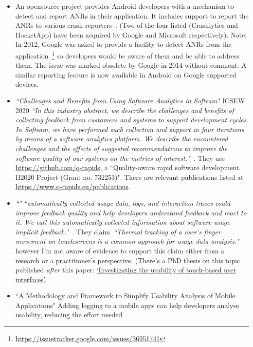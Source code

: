 \begin{itemize}
    \item An opensource project provides Android developers with a mechanism to detect and report ANRs in their application. It includes support to report the ANRs to various crash reporters~\citep{salomonbrys_github_anr_watchdog}. (Two of the four listed (Crashlytics and HocketApp) have been acquired by Google and Microsoft respectively). Note: In 2012, Google was asked to provide a facility to detect ANRs from the application~\footnote{\url{https://issuetracker.google.com/issues/36951741}} so developers would be aware of them and be able to address them. The issue was marked obsolete by Google in 2014 without comment. A similar reporting feature is now available in Android on Google supported devices.
    
    \item \emph{``Challenges and Benefits from Using Software Analytics in Softeam"} ICSEW 2020 \emph{``In this industry abstract, we describe the challenges and benefits of collecting feedback from customers and systems to support development cycles. In Softeam, we have performed such collection and support in four iterations by means of a software analytics platform. We describe the encountered challenges and the effects of suggested recommendations to improve the software quality of our systems on the metrics of interest."}~\cite{bagnato2020_challenges_and_benefits_from_using_software_analytics_in_softeam}. They use \url{https://github.com/q-rapids}, a ``Quality-aware rapid software development. H2020 Project (Grant no. 732253)". There are relevant publications listed at \url{https://www.q-rapids.eu/publications}.
    \item \emph{``"} \emph{``automatically collected usage data, logs, and interaction traces could improve feedback quality and help developers understand feedback and react to it. We call this automatically collected information about software usage implicit feedback."}~\citep{maalej2016_towards_data_driven_requirements_engineering}. They claim~\emph{``Thermal tracking of a user’s finger movement on touchscreens is a common approach for usage data analysis."} however I'm not aware of evidence to support this claim either from a research or a practitioner's perspective. (There's a PhD thesis on this topic published \emph{after} this paper: \href{http://usir.salford.ac.uk/id/eprint/37784/}{`Investigating the usability of touch-based user interfaces'}.
    
    \item ``A Methodology and Framework to Simplify Usability Analysis of Mobile Applications" Adding logging to a mobile apps can help developers analyse usability, reducing the effort needed
    

\end{itemize}

